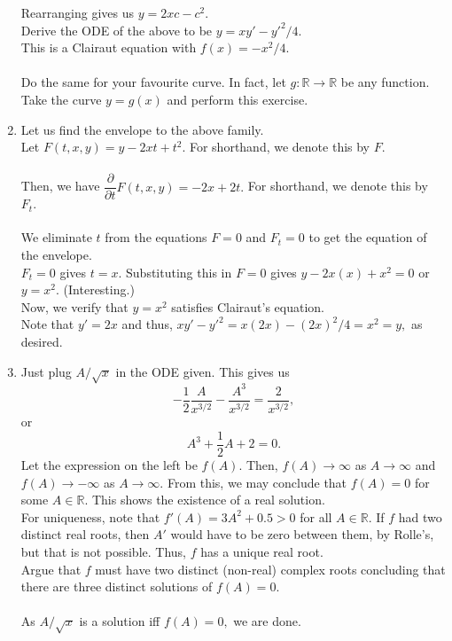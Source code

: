 \documentclass[12pt]{article}
\theoremstyle{definition}
\numberwithin{thm}{section}
\begin{document}
\begin{enumerate}[leftmargin=*, label = Q.\arabic*.]
	Rearranging gives us $y = 2xc - c^2.$\\
	Derive the ODE of the above to be $y = xy' - y'^2/4.$\\
	This is a Clairaut equation with $f(x) = -x^2/4.$\\~\\
	Do the same for your favourite curve. In fact, let $g:\mathbb{R}\to\mathbb{R}$ be any function. Take the curve $y = g(x)$ and perform this exercise.
	\item Let us find the envelope to the above family.\\
	Let $F(t, x, y) = y - 2xt + t^2.$ For shorthand, we denote this by $F.$\\~\\
	Then, we have $\dfrac{\partial}{\partial t}F(t, x, y) = -2x + 2t.$ For shorthand, we denote this by $F_t.$\\~\\
	We eliminate $t$ from the equations $F = 0$ and $F_t = 0$ to get the equation of the envelope.\\
	$F_t = 0$ gives $t = x.$ Substituting this in $F = 0$ gives $y - 2x(x) + x^2 = 0$ or $y = x^2.$ \hfill (Interesting.)\\
	Now, we verify that $y = x^2$ satisfies Clairaut's equation.\\
	Note that $y' = 2x$ and thus, $xy' - y'^2 = x(2x) - (2x)^2/4 = x^2 = y,$ as desired.
	\item Just plug $A/\sqrt{x}$ in the ODE given. This gives us
	\[-\frac{1}{2}\frac{A}{x^{3/2}} - \frac{A^3}{x^{3/2}} = \dfrac{2}{x^{3/2}},\]
	or
	\[A^3 + \dfrac{1}{2}A + 2 = 0.\]
	Let the expression on the left be $f(A).$ Then, $f(A) \to \infty$ as $A \to \infty$ and $f(A) \to -\infty$ as $A \to \infty.$ From this, we may conclude that $f(A) = 0$ for some $A \in \mathbb{R}.$ This shows the existence of a real solution.\\
	For uniqueness, note that $f'(A) = 3A^2 + 0.5 > 0$ for all $A \in \mathbb{R}.$ If $f$ had two distinct real roots, then $A'$ would have to be zero between them, by Rolle's, but that is not possible. Thus, $f$ has a unique real root.\\
	Argue that $f$ must have two distinct (non-real) complex roots concluding that there are three distinct solutions of $f(A) = 0.$\\~\\
	As $A/\sqrt{x}$ is a solution iff $f(A) = 0,$ we are done.
\end{enumerate}
\end{document}

